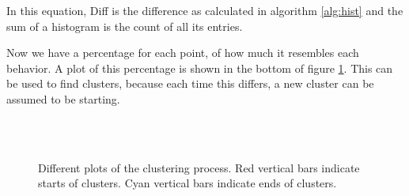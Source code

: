 In this equation, Diff is the difference as calculated in algorithm
\ref{alg:hist} and the sum of a histogram is the count of all its entries. 

Now we have a percentage for each point, of how much it resembles each behavior.
A plot of this percentage is shown in the bottom of figure \ref{fig:clustering}.
This can be used to find clusters, because each time this differs, a new
cluster can be assumed to be starting.


\begin{figure}
  \centering
   \\
   \\
  \caption{Different plots of the clustering process. Red vertical bars indicate starts of clusters. Cyan vertical bars indicate ends of clusters.}
  \label{fig:clustering}
\end{figure}


